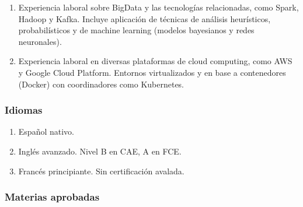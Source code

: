 \documentclass[a4paper,11pt]{article}
\begin{document}
\begin{enumerate}
  \item Experiencia laboral sobre BigData y las tecnologías relacionadas, como
    Spark, Hadoop y Kafka. Incluye aplicación de técnicas de análisis
    heurísticos, probabilísticos y de machine learning (modelos bayesianos y
    redes neuronales).

  \item Experiencia laboral en diversas plataformas de cloud computing, como
    AWS y Google Cloud Platform. Entornos virtualizados y en base a
      contenedores (Docker) con coordinadores como Kubernetes.

\end{enumerate}

\subsubsection{Idiomas}

\begin{enumerate}

  \item Español nativo.

  \item Inglés avanzado. Nivel B en CAE, A en FCE.

  \item Francés principiante. Sin certificación avalada.

\end{enumerate}

\subsubsection{Materias aprobadas}
\end{document}

